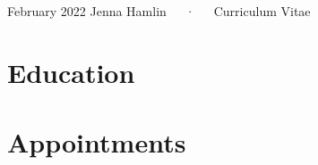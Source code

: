 \documentclass[11pt, a4paper]{awesome-cv}
\begin{document}
\makecvheader

\makecvfooter
  {February 2022}
    {Jenna Hamlin~~~·~~~Curriculum Vitae}
  {\thepage}





\hypertarget{education}{%
\section{Education}\label{education}}

\begin{cventries}
    \vspace{-4.0mm}
    \vspace{-4.0mm}
\end{cventries}

\hypertarget{appointments}{%
\section{Appointments}\label{appointments}}
\end{document}
